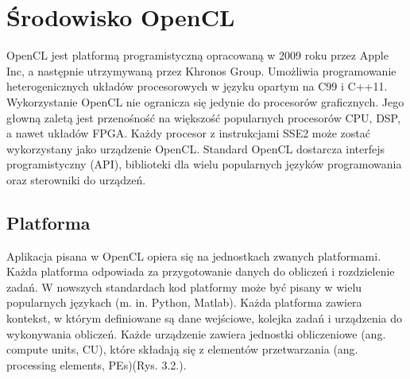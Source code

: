 
\section{Środowisko OpenCL}\label{sec:OpenCL}

OpenCL jest platformą programistyczną opracowaną w 2009 roku przez Apple Inc, a następnie utrzymywaną przez Khronos Group. Umożliwia programowanie heterogenicznych układów procesorowych w języku opartym na C99 i C++11. Wykorzystanie OpenCL nie ogranicza się jedynie do procesorów graficznych. Jego głowną zaletą jest przenośność na większość popularnych procesorów CPU, DSP, a nawet układów FPGA. Każdy procesor z instrukcjami SSE2 może zostać wykorzystany jako urządzenie OpenCL. Standard OpenCL dostarcza interfejs programistyczny (API), biblioteki dla wielu popularnych języków programowania oraz sterowniki do urządzeń.

\subsection{Platforma}\label{sec:platforma}

Aplikacja pisana w OpenCL opiera się na jednostkach zwanych platformami. Każda platforma odpowiada za przygotowanie danych do obliczeń i rozdzielenie zadań. W nowszych standardach kod platformy może być pisany w wielu popularnych językach  (m. in. Python, Matlab). Każda platforma zawiera kontekst, w którym definiowane są dane wejściowe, kolejka zadań i urządzenia do wykonywania obliczeń. Każde urządzenie zawiera jednostki obliczeniowe (ang. compute units, CU), które składają się z elementów przetwarzania (ang. processing elements, PEs)(Rys. 3.2.). 

